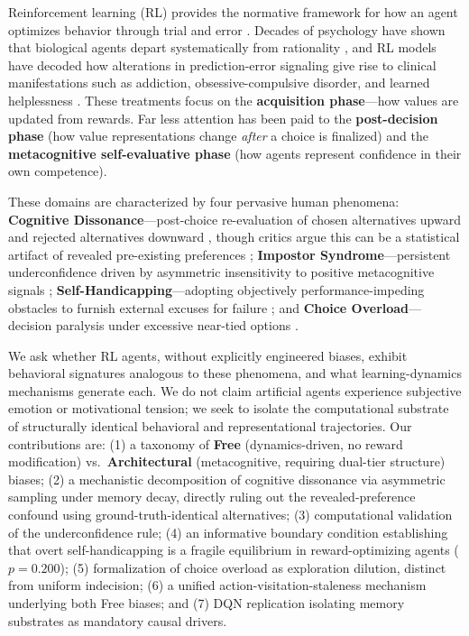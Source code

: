 \documentclass[conference]{IEEEtran}
\begin{document}
Reinforcement learning (RL) provides the normative framework for how an agent optimizes behavior through trial and error \citep{sutton2018reinforcement}. Decades of psychology have shown that biological agents depart systematically from rationality \citep{kahneman2011thinking}, and RL models have decoded how alterations in prediction-error signaling give rise to clinical manifestations such as addiction, obsessive-compulsive disorder, and learned helplessness \citep{daw2005uncertainty,huys2009bayesian,dolan2013goals}. These treatments focus on the \textbf{acquisition phase}---how values are updated from rewards. Far less attention has been paid to the \textbf{post-decision phase} (how value representations change \textit{after} a choice is finalized) and the \textbf{metacognitive self-evaluative phase} (how agents represent confidence in their own competence).

These domains are characterized by four pervasive human phenomena: \textbf{Cognitive Dissonance}---post-choice re-evaluation of chosen alternatives upward and rejected alternatives downward \citep{brehm1956postdecision,festinger1957theory}, though critics argue this can be a statistical artifact of revealed pre-existing preferences \citep{chen2010choice}; \textbf{Impostor Syndrome}---persistent underconfidence driven by asymmetric insensitivity to positive metacognitive signals \citep{clance1978imposter,katyal2025distorted}; \textbf{Self-Handicapping}---adopting objectively performance-impeding obstacles to furnish external excuses for failure \citep{berglas1978drug}; and \textbf{Choice Overload}---decision paralysis under excessive near-tied options \citep{iyengar2000choice,schwartz2004paradox}.

We ask whether RL agents, without explicitly engineered biases, exhibit behavioral signatures analogous to these phenomena, and what learning-dynamics mechanisms generate each. We do not claim artificial agents experience subjective emotion or motivational tension; we seek to isolate the computational substrate of structurally identical behavioral and representational trajectories. Our contributions are: (1) a taxonomy of \textbf{Free} (dynamics-driven, no reward modification) vs.\ \textbf{Architectural} (metacognitive, requiring dual-tier structure) biases; (2) a mechanistic decomposition of cognitive dissonance via asymmetric sampling under memory decay, directly ruling out the \citet{chen2010choice} revealed-preference confound using ground-truth-identical alternatives; (3) computational validation of the \citet{katyal2025distorted} underconfidence rule; (4) an informative boundary condition establishing that overt self-handicapping is a fragile equilibrium in reward-optimizing agents ($p=0.200$); (5) formalization of choice overload as exploration dilution, distinct from uniform indecision; (6) a unified action-visitation-staleness mechanism underlying both Free biases; and (7) DQN replication isolating memory substrates as mandatory causal drivers.
\end{document}
